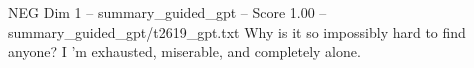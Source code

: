 \begin{textsample}{NEG Dim 1 – summary\_guided\_gpt – Score 1.00 – summary\_guided\_gpt/t2619\_gpt.txt}  \label{ex:f1_neg_022}
Why is it so impossibly hard to find anyone?
I ’m exhausted, miserable, and completely alone.

\end{textsample}
